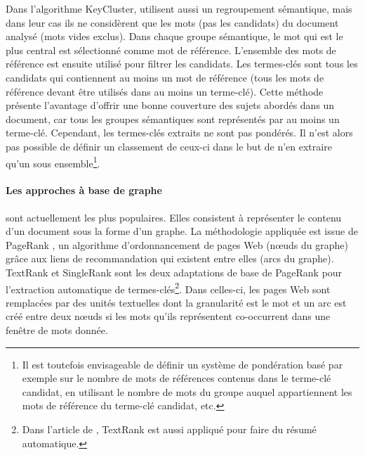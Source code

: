           Dans l'algorithme KeyCluster,   utilisent
          aussi un regroupement sémantique, mais dans leur cas ils ne
          considèrent que les mots (pas les candidats) du document analysé (mots
          vides exclus). Dans chaque groupe sémantique, le mot qui est le plus
          central est sélectionné comme mot de référence. L'ensemble des mots de
          référence est ensuite utilisé pour filtrer les candidats. Les
          termes-clés sont tous les candidats qui contiennent au moins un mot de
          référence (tous les mots de référence devant être utilisés dans au
          moins un terme-clé). Cette méthode présente l'avantage d'offrir une
          bonne couverture des sujets abordés dans un document, car tous les
          groupes sémantiques sont représentés par au moins un terme-clé.
          Cependant, les termes-clés extraits ne sont pas pondérés. Il n'est
          alors pas possible de définir un classement de ceux-ci dans le but de
          n'en extraire qu'un sous ensemble\footnote{Il est toutefois
          envisageable de définir un système de pondération basé par exemple sur
          le nombre de mots de références contenus dans le terme-clé candidat,
          en  utilisant le nombre de mots du groupe auquel appartiennent les
          mots de référence du terme-clé candidat, etc.}.

        \paragraph{Les approches à base de graphe}
          sont actuellement les plus populaires. Elles consistent à représenter
          le contenu d'un document sous la forme d'un graphe. La méthodologie
          appliquée est issue de PageRank \cite{brin1998pagerank}, un
          algorithme d'ordonnancement de pages Web (n\oe{}uds du graphe) grâce
          aux liens de recommandation qui existent entre elles (arcs du graphe).
          TextRank \cite{mihalcea2004textrank} et SingleRank
          \cite{wan2008expandrank} sont les deux adaptations de base de
          PageRank pour l'extraction automatique de termes-clés\footnote{Dans
          l'article de , TextRank est aussi appliqué
          pour faire du résumé automatique.}. Dans celles-ci, les pages Web sont
          remplacées par des unités textuelles dont la granularité est le mot et
          un arc est créé entre deux n\oe{}uds si les mots qu'ils représentent
          co-occurrent dans une fenêtre de mots donnée.
        
